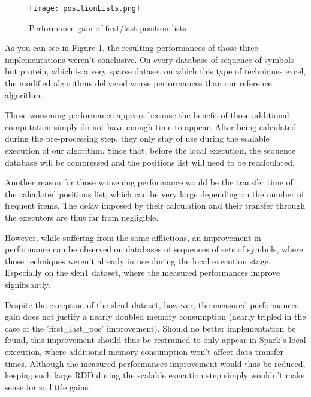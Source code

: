 \documentclass{eplmastersthesis}
\begin{document}
\begin{figure}[h]
  \centering
  \texttt{[image: positionLists.png]}
  \caption{Performance gain of first/last position lists}
  \label{fig:positionListPerf}
\end{figure}

As you can see in Figure \ref{fig:positionListPerf}, the resulting performances of those three implementations weren't conclusive. On every database of sequence of symbols but protein, which is a very sparse dataset on which this type of techniques excel, the modified algorithms delivered worse performances than our reference algorithm. \newline

Those worsening performance appears because the benefit of those additional computation simply do not have enough time to appear. After being calculated during the pre-processing step, they only stay of use during the scalable execution of our algorithm. Since that, before the local execution, the sequence database will be compressed and the positions list will need to be recalculated. \newline

Another reason for those worsening performance would be the transfer time of the calculated positions list, which can be very large depending on the number of frequent items. The delay imposed by their calculation and their transfer through the executors are thus far from negligible. \newline

However, while suffering from the same afflictions, an improvement in performance can be observed on databases of sequences of sets of symbols, where those techniques weren't already in use during the local execution stage. Especially on the slen1 dataset, where the measured performances improve significantly. \newline

Despite the exception of the slen1 dataset, however, the measured performances gain does not justify a nearly doubled memory consumption (nearly tripled in the case of the 'first\_last\_pos' improvement). Should no better implementation be found, this improvement should thus be restrained to only appear in Spark's local execution, where additional memory consumption won't affect data transfer times. Although the measured performances improvement would thus be reduced, keeping such large RDD during the scalable execution step simply wouldn't make sense for so little gains.
\end{document}
